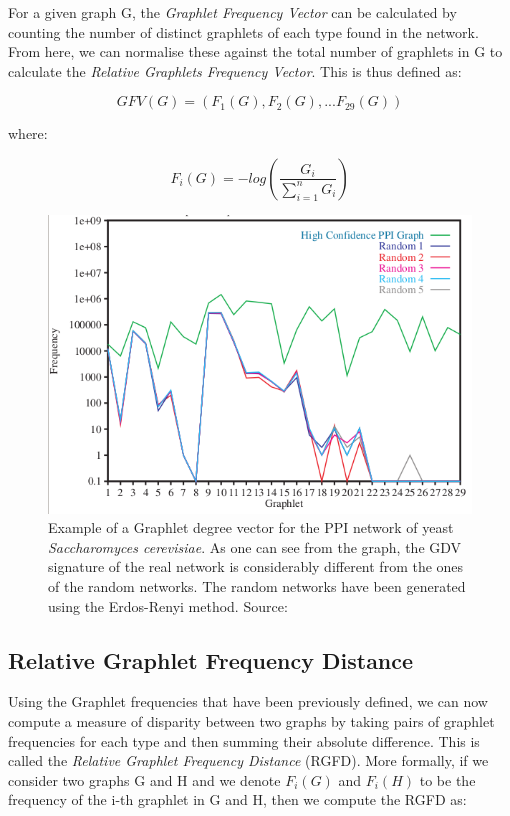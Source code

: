 For a given graph G, the \emph{Graphlet Frequency Vector} can be calculated by
counting the number of distinct graphlets of each type found in the network.
From here, we can normalise these against the total number of graphlets in G to
calculate the \emph{Relative Graphlets Frequency Vector}. This is thus defined
as:

\begin{equation}
 GFV(G) = \left(F_1(G), F_2(G), ... F_{29}(G)\right)
\end{equation}

where:

$$ F_i(G) = -log\left(\frac{G_i}{\sum_{i=1}^{n}G_i}\right) $$

\begin{figure}[h]
  \centering
\includegraphics[scale=0.7]{images/gdv-er-interactome.png}
\caption{Example of a Graphlet degree vector for the PPI network of yeast
\emph{Saccharomyces cerevisiae}. As one can see from the graph, the GDV
signature of the real network is considerably different from the ones of the
random networks. The random networks have been generated using the Erdos-Renyi
method. Source: \cite{prvzulj2004modeling}}
\label{fig:gdv_er}
\end{figure}

\subsection{Relative Graphlet Frequency Distance}

Using the Graphlet frequencies that have been previously defined, we can now
compute a measure of disparity between two graphs by taking pairs of
graphlet frequencies for each type and then summing their absolute difference.
This is called the \emph{Relative Graphlet Frequency Distance} (RGFD). More
formally, if we consider two graphs G and H and we denote \(F_i(G)\) and
\(F_i(H)\) to be the frequency of the i-th graphlet in G and H, then we
compute the RGFD as:

